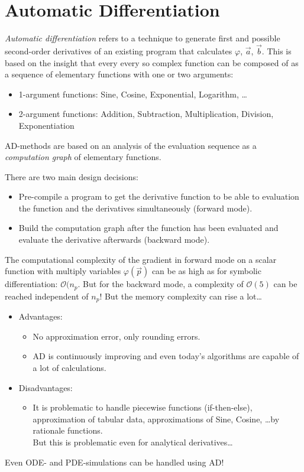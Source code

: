 	\section{Automatic Differentiation}
		\emph{Automatic differentiation} refers to a technique to generate first and possible second-order derivatives of an existing program that calculates \(\varphi\), \(\vec{a}\), \(\vec{b}\). This is based on the insight that every every so complex function can be composed of as a sequence of elementary functions with one or two arguments:
		\begin{itemize}
			\item 1-argument functions: Sine, Cosine, Exponential, Logarithm, \dots
			\item 2-argument functions: Addition, Subtraction, Multiplication, Division, Exponentiation
		\end{itemize}
		AD-methods are based on an analysis of the evaluation sequence as a \emph{computation graph} of elementary functions.

		There are two main design decisions:
		\begin{itemize}
			\item Pre-compile a program to get the derivative function to be able to evaluation the function and the derivatives simultaneously (forward mode).
			\item Build the computation graph after the function has been evaluated and evaluate the derivative afterwards (backward mode).
		\end{itemize}
		The computational complexity of the gradient in forward mode on a scalar function with multiply variables \(\varphi(\vec{p})\) can be as high as for symbolic differentiation: \( \mathcal{O}(n_p \). But for the backward mode, a complexity of \( \mathcal{O}(5) \) can be reached independent of \( n_p \)! But the memory complexity can rise a lot\dots

		\begin{itemize}
			\item Advantages:
				\begin{itemize}
					\item No approximation error, only rounding errors.
					\item AD is continuously improving and even today's algorithms are capable of a lot of calculations.
				\end{itemize}
			\item Disadvantages:
				\begin{itemize}
					\item It is problematic to handle piecewise functions (if-then-else), approximation of tabular data, approximations of Sine, Cosine, \dots by rationale functions. \\ But this is problematic even for analytical derivatives\dots
				\end{itemize}
		\end{itemize}
		Even ODE- and PDE-simulations can be handled using AD!

